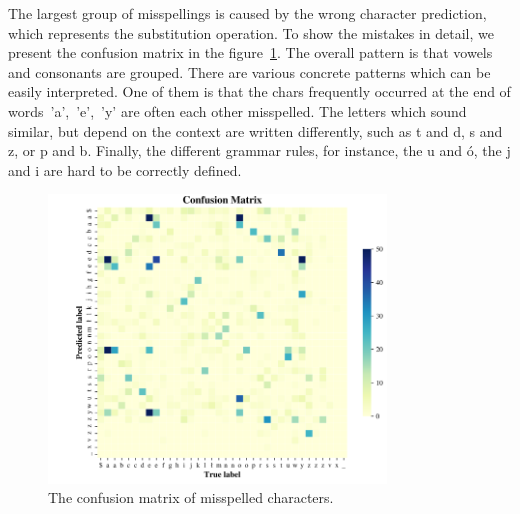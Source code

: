 The largest group of misspellings is caused by the wrong character prediction, which represents the substitution operation.
To show the mistakes in detail, we present the confusion matrix
in the figure~\ref{fig:evaluation-confusion_matrix}.
The overall pattern is that vowels and consonants are grouped.
There are various concrete patterns which can be easily interpreted.
One of them is that the chars frequently occurred at the end of words~'a',~'e',~'y'
are often each other misspelled.
The letters which sound similar, but depend on the context are written differently, such as
t and d, s and z, or p and b.
Finally, the different grammar rules, for instance, the u and ó, the j and i are hard to be correctly defined.

\begin{figure}[h]
\vspace*{15pt}
    \centering
    \includegraphics[width=0.8\textwidth]{figures/evaluation-confusion_matrix.png}
    \caption{
The confusion matrix of misspelled characters.
}
    \label{fig:evaluation-confusion_matrix}
\end{figure}

